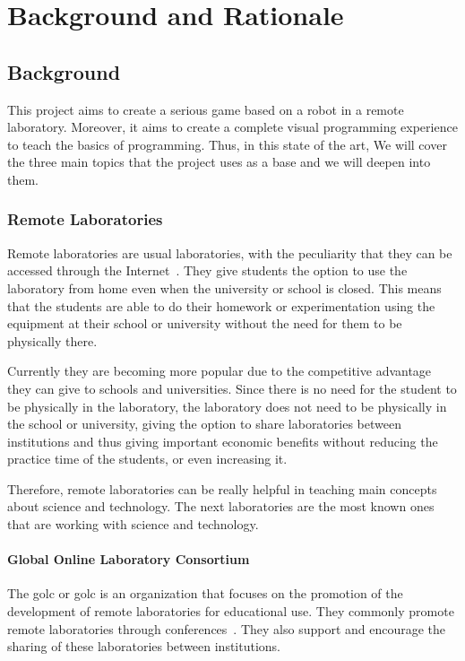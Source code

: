 \chapter{Background and Rationale}

\section{Background}

This project aims to create a serious game based on a robot in a remote laboratory. Moreover, it
aims to create a complete visual programming experience to teach the basics of programming. Thus,
in this state of the art, We will cover the three main topics that the project uses as a base and we
will deepen into them.

\subsection{Remote Laboratories}

Remote laboratories are usual laboratories, with the peculiarity that they can be accessed through
the Internet~\cite{remote_labs}. They give students the option to use the laboratory from home even
when the university or school is closed. This means that the students are able to do their homework
or experimentation using the equipment at their school or university without the need for them to be
physically there.

Currently they are becoming more popular due to the competitive advantage they can give to schools
and universities. Since there is no need for the student to be physically in the laboratory, the
laboratory does not need to be physically in the school or university, giving the option to share
laboratories between institutions and thus giving important economic benefits without reducing
the practice time of the students, or even increasing it.

Therefore, remote laboratories can be really helpful in teaching main concepts about science and
technology. The next laboratories are the most known ones that are working with science and
technology.

\subsubsection{Global Online Laboratory Consortium}

The \acrlong{golc} or \acrshort{golc} is an organization that focuses on the promotion of the
development of remote laboratories for educational use. They commonly promote remote laboratories
through conferences~\cite{golc1st}. They also support and encourage the sharing of these
laboratories between institutions.

